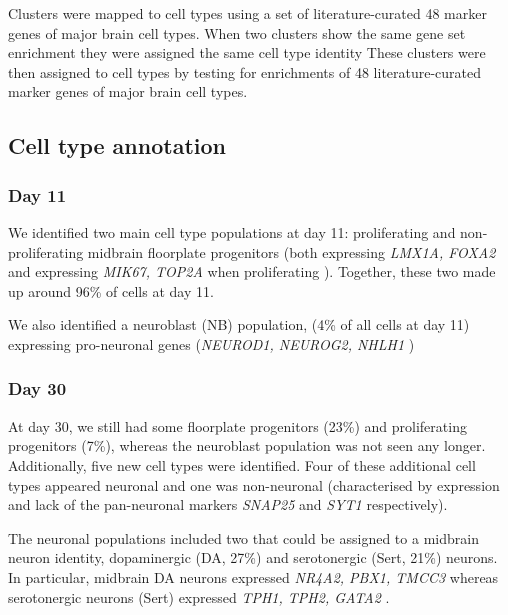Clusters were mapped to cell types using a set of literature-curated 48 marker genes of major brain cell types. 
When two clusters show the same gene set enrichment they were assigned the same cell type identity
These clusters were then assigned to cell types by testing for enrichments of 48 literature-curated marker genes of major brain cell types.\\

\subsection{Cell type annotation}


\subsubsection{Day 11}

We identified two main cell type populations at day 11: proliferating and non-proliferating midbrain floorplate progenitors (both expressing \textit{LMX1A, FOXA2} and expressing \textit{MIK67, TOP2A} when proliferating \cite{la2016molecular}).
Together, these two made up around 96\% of cells at day 11.

We also identified a neuroblast (NB) population, (4\% of all cells at day 11) expressing pro-neuronal genes (\textit{NEUROD1, NEUROG2, NHLH1} \cite{bertrand2002proneural, lacomme2012neurog2})

\subsubsection{Day 30}

At day 30, we still had some floorplate progenitors (23\%) and proliferating progenitors (7\%), whereas the neuroblast population was not seen any longer.
Additionally, five new cell types were identified.
Four of these additional cell types appeared neuronal and one was non-neuronal (characterised by expression and lack of the pan-neuronal markers \textit{SNAP25} and \textit{SYT1} respectively). 


The neuronal populations included two that could be assigned to a midbrain neuron identity, dopaminergic (DA, 27\%) and serotonergic (Sert, 21\%) neurons.
In particular, midbrain DA neurons expressed \textit{NR4A2, PBX1, TMCC3} \cite{la2016molecular, park2006acquisition, ramonet2012park9} whereas serotonergic neurons (Sert) expressed \textit{TPH1, TPH2, GATA2} \cite{cummings2019serotonergic}. 

